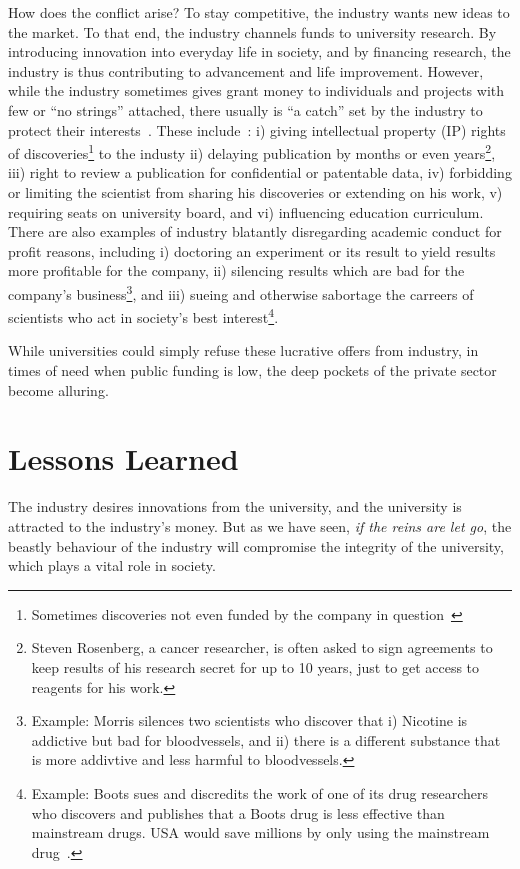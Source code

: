 \documentclass[draft,11pt,openright,monochrome,british,a4paper]{scrartcl}
\begin{document}
How does the conflict arise? To stay competitive, the industry wants
new ideas to the market. To that end, the industry channels funds to
university research. By introducing innovation into everyday life in
society, and by financing research, the industry is thus contributing
to advancement and life improvement. However, while the industry
sometimes gives grant money to individuals and projects with few or
``no strings'' attached, there usually is ``a catch'' set by the
industry to protect their interests~\cite{pain2008}. These
include~\cite{pain2008,washburn2001,resnik2003}: i) giving
intellectual property (IP) rights of discoveries\footnote{Sometimes
  discoveries not even funded by the company in
  question~\cite{washburn2001}} to the industy ii) delaying
publication by months or even years\footnote{Steven Rosenberg, a
  cancer researcher, is often asked to sign agreements to keep results
  of his research secret for up to 10 years, just to get access to
  reagents for his work.\cite{washburn2001}}, iii) right to review a
publication for confidential or patentable data, iv)
forbidding or limiting the scientist from sharing his discoveries or
extending on his work, v) requiring seats on university board, and vi)
influencing education curriculum. There are also examples of industry
blatantly disregarding academic conduct for profit reasons, including
i) doctoring an experiment or its result to yield results more
profitable for the company, ii) silencing results which are bad for
the company's business\footnote{Example: Morris silences two
  scientists who discover that i) Nicotine is addictive but bad for
  bloodvessels, and ii) there is a different substance that is more
  addivtive and less harmful to bloodvessels.}, and iii) sueing and
otherwise sabortage the carreers of scientists who act in society's
best interest\footnote{Example: Boots sues and discredits the work of
  one of its drug researchers who discovers and publishes that a Boots
  drug is less effective than mainstream drugs. USA would save
  millions by only using the mainstream drug~\cite{resnik2003}.}.

While universities could simply refuse these lucrative offers from
industry, in times of need when public funding is low, the deep
pockets of the private sector become alluring.

\section{Lessons Learned}
The industry desires innovations from the university, and the
university is attracted to the industry's money. But as we have seen,
\emph{if the reins are let go}, the beastly behaviour of the industry
will compromise the integrity of the university, which plays a vital
role in society.
\end{document}
